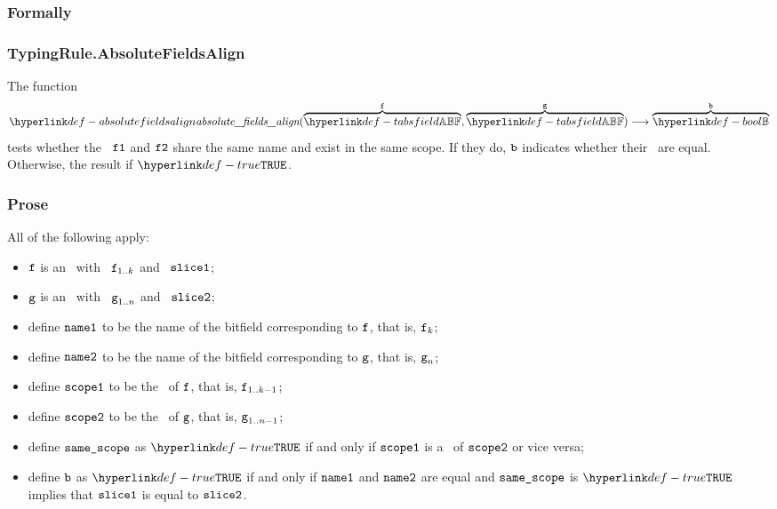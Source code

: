 \subsubsection{Formally}
\begin{mathpar}
\end{mathpar}

\subsubsection{TypingRule.AbsoluteFieldsAlign\label{sec:TypingRule.AbsoluteFieldsAlign}}
\hypertarget{def-absolutefieldsalign}{}
The function
\[
\absolutefieldsalign(\overname{\TAbsField}{\vf}, \overname{\TAbsField}{\vg})
\aslto \overname{\Bool}{\vb}
\]
tests whether the \absolutebitfields\ $\vfone$ and $\vftwo$ share the same name
and exist in the same scope. If they do, $\vb$ indicates whether their \absoluteslices\
are equal. Otherwise, the result if $\True$.

\subsubsection{Prose}
All of the following apply:
\begin{itemize}
  \item $\vf$ is an \absolutebitfield\ with \absolutename\ $\vf_{1..k}$ and \absoluteslice\ $\vsliceone$;
  \item $\vg$ is an \absolutebitfield\ with \absolutename\ $\vg_{1..n}$ and \absoluteslice\ $\vslicetwo$;
  \item define $\nameone$ to be the name of the bitfield corresponding to $\vf$, that is, $\vf_k$;
  \item define $\nametwo$ to be the name of the bitfield corresponding to $\vg$, that is, $\vg_n$;
  \item define $\vscopeone$ to be the \bitfieldscope\ of $\vf$, that is, $\vf_{1..k-1}$;
  \item define $\vscopetwo$ to be the \bitfieldscope\ of $\vg$, that is, $\vg_{1..n-1}$;
  \item define $\vsamescope$ as $\True$ if and only if $\vscopeone$ is a \listprefixterm\ of $\vscopetwo$ or vice versa;
  \item define $\vb$ as $\True$ if and only if $\nameone$ and $\nametwo$ are equal and $\vsamescope$ is $\True$ implies
        that $\vsliceone$ is equal to $\vslicetwo$.
\end{itemize}

